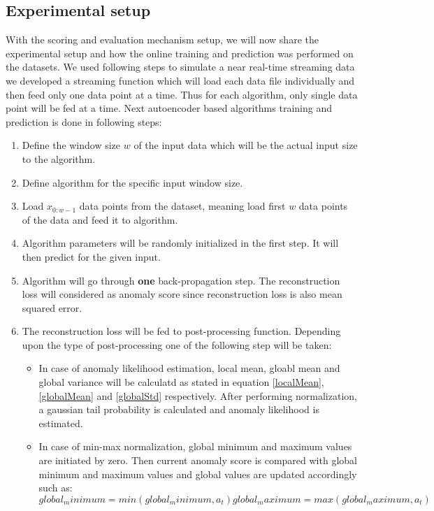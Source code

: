 \documentclass[12pt]{article}
\begin{document}
\subsection{Experimental setup}
With the scoring and evaluation mechanism setup, we will now share the experimental setup and how the online training and prediction was performed on the datasets. We used following steps to simulate a near real-time streaming data we developed a streaming function which will load each data file individually and then feed only one data point at a time. Thus for each algorithm, only single data point will be fed at a time. Next autoencoder based algorithms training and prediction is done in following steps:
\begin{enumerate}
	\item Define the window size $w$ of the input data which will be the actual input size to the algorithm.
	\item Define algorithm for the specific input window size. 
	\item Load $x_{0:w-1}$ data points from the dataset, meaning load first $w$ data points of the data and feed it to algorithm.
	\item Algorithm parameters will be randomly initialized in the first step. It will then predict for the given input.
	\item Algorithm will go through \textbf{one} back-propagation step. The reconstruction loss will considered as anomaly score since reconstruction loss is also mean squared error.
	\item The reconstruction loss will be fed to post-processing function. Depending upon the type of post-processing one of the following step will be taken:
	\begin{itemize}
		\item In case of anomaly likelihood estimation, local mean, gloabl mean and global variance will be calculatd as stated in equation \ref{localMean},\ref{globalMean} and \ref{globalStd} respectively. After performing normalization, a gaussian tail probability is calculated and anomaly likelihood is estimated.
		\item In case of min-max normalization, global minimum and maximum values are initiated by zero. Then current anomaly score is compared with global minimum and maximum values and global values are updated accordingly such as:
		\begin{equation}
			global_minimum = min(global_minimum, a_t)
			global_maximum = max(global_maximum, a_t)
		\end{equation}

\end{itemize}
\end{enumerate}
\end{document}

